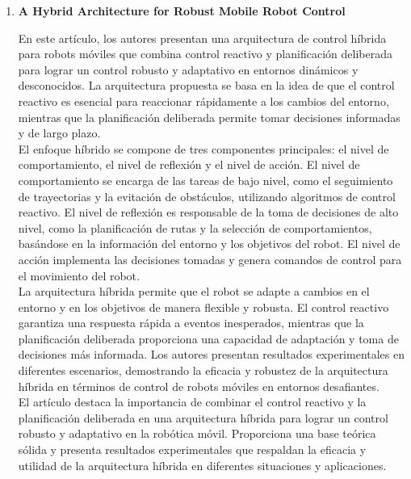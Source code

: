 \documentclass{article}
\begin{document}
\begin{itemize}
\begin{enumerate}
  \item \textbf{A Hybrid Architecture for Robust Mobile Robot Control}

    En este artículo, los autores presentan una arquitectura de control híbrida para robots móviles que combina control reactivo y planificación deliberada para lograr un control robusto y adaptativo en entornos dinámicos y desconocidos. La arquitectura propuesta se basa en la idea de que el control reactivo es esencial para reaccionar rápidamente a los cambios del entorno, mientras que la planificación deliberada permite tomar decisiones informadas y de largo plazo.\\

    El enfoque híbrido se compone de tres componentes principales: el nivel de comportamiento, el nivel de reflexión y el nivel de acción. El nivel de comportamiento se encarga de las tareas de bajo nivel, como el seguimiento de trayectorias y la evitación de obstáculos, utilizando algoritmos de control reactivo. El nivel de reflexión es responsable de la toma de decisiones de alto nivel, como la planificación de rutas y la selección de comportamientos, basándose en la información del entorno y los objetivos del robot. El nivel de acción implementa las decisiones tomadas y genera comandos de control para el movimiento del robot.\\

    La arquitectura híbrida permite que el robot se adapte a cambios en el entorno y en los objetivos de manera flexible y robusta. El control reactivo garantiza una respuesta rápida a eventos inesperados, mientras que la planificación deliberada proporciona una capacidad de adaptación y toma de decisiones más informada. Los autores presentan resultados experimentales en diferentes escenarios, demostrando la eficacia y robustez de la arquitectura híbrida en términos de control de robots móviles en entornos desafiantes.\\

    El artículo destaca la importancia de combinar el control reactivo y la planificación deliberada en una arquitectura híbrida para lograr un control robusto y adaptativo en la robótica móvil. Proporciona una base teórica sólida y presenta resultados experimentales que respaldan la eficacia y utilidad de la arquitectura híbrida en diferentes situaciones y aplicaciones.\\

    
    
  \end{enumerate}
    


\end{itemize}
\end{document}
